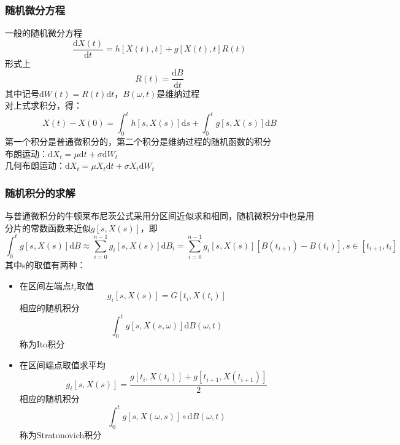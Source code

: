 \documentclass{ctexbeamer}
\begin{document}
	\begin{frame}

		\frametitle{随机微分方程}

		一般的随机微分方程$$\frac{\mathrm{d}X(t)}{\mathrm{d}t}=h[X(t),t]+g[X(t),t]R(t)$$
		形式上$$R(t)=\frac{\mathrm{d}B}{\mathrm{d}t}$$
		其中记号$\mathrm{d}W(t)=R(t)\mathrm{d}t$，$B(\omega,t)$是维纳过程 \\
		对上式求积分，得：$$X(t)-X(0)=\int_0^t h[s,X(s)]\mathrm{d}s + \int_0^t g[s,X(s)]\mathrm{d}B$$
		第一个积分是普通微积分的，第二个积分是维纳过程的随机函数的积分\\
		布朗运动：$\mathrm{d}X_t = \mu \mathrm{d}t + \sigma\mathrm{d}W_t$\\
		几何布朗运动：$\mathrm{d}X_t = \mu X_t\mathrm{d}t + \sigma X_t\mathrm{d}W_t$

	\end{frame}

	\begin{frame}

		\frametitle{随机积分的求解}
		\footnotesize  

		与普通微积分的牛顿莱布尼茨公式采用分区间近似求和相同，随机微积分中也是用分片的常数函数来近似$g[s,X(s)]$，即$$\int_0^tg[s,X(s)]\mathrm{d}B \approx \sum_{i=0}^{n-1}g_i[s,X(s)]\mathrm{d}B_i = \sum_{i=0}^{n-1}g_i[s,X(s)][B(t_{i+1})-B(t_i)], s \in [t_{i+1},t_i]$$
		其中s的取值有两种：

		\begin{itemize}

		\item 在区间左端点$t_i$取值$$g_i[s,X(s)]=G[t_i,X(t_i)]$$
			相应的随机积分$$\int_0^t g[s,X(s,\omega)]\mathrm{d}B(\omega,t)$$
			称为Ito积分

		\item 在区间端点取值求平均$$g_i[s,X(s)]=\frac{g[t_i,X(t_i)]+g[t_{i+1},X(t_{i+1})]}{2}$$
			相应的随机积分$$\int_0^t g[s,X(\omega,s)]∘\mathrm{d}B(\omega,t)$$
			称为Stratonovich积分

		\end{itemize}

	\end{frame}
\end{document}
